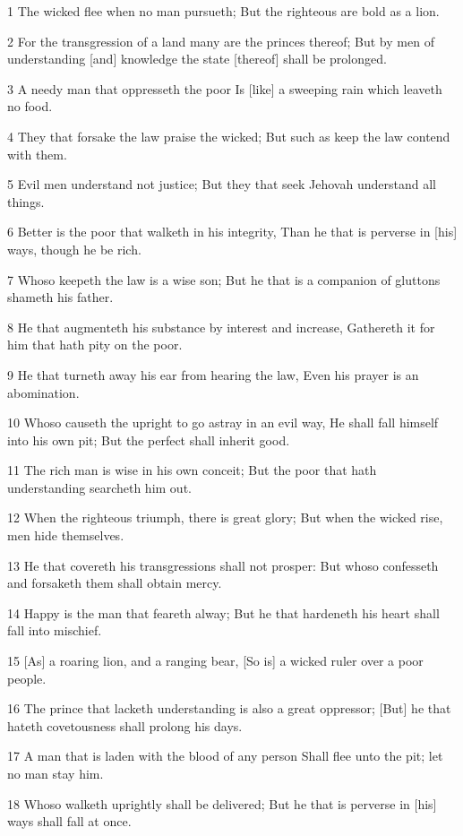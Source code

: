 \par 1 The wicked flee when no man pursueth; But the righteous are bold as a lion.
\par 2 For the transgression of a land many are the princes thereof; But by men of understanding [and] knowledge the state [thereof] shall be prolonged.
\par 3 A needy man that oppresseth the poor Is [like] a sweeping rain which leaveth no food.
\par 4 They that forsake the law praise the wicked; But such as keep the law contend with them.
\par 5 Evil men understand not justice; But they that seek Jehovah understand all things.
\par 6 Better is the poor that walketh in his integrity, Than he that is perverse in [his] ways, though he be rich.
\par 7 Whoso keepeth the law is a wise son; But he that is a companion of gluttons shameth his father.
\par 8 He that augmenteth his substance by interest and increase, Gathereth it for him that hath pity on the poor.
\par 9 He that turneth away his ear from hearing the law, Even his prayer is an abomination.
\par 10 Whoso causeth the upright to go astray in an evil way, He shall fall himself into his own pit; But the perfect shall inherit good.
\par 11 The rich man is wise in his own conceit; But the poor that hath understanding searcheth him out.
\par 12 When the righteous triumph, there is great glory; But when the wicked rise, men hide themselves.
\par 13 He that covereth his transgressions shall not prosper: But whoso confesseth and forsaketh them shall obtain mercy.
\par 14 Happy is the man that feareth alway; But he that hardeneth his heart shall fall into mischief.
\par 15 [As] a roaring lion, and a ranging bear, [So is] a wicked ruler over a poor people.
\par 16 The prince that lacketh understanding is also a great oppressor; [But] he that hateth covetousness shall prolong his days.
\par 17 A man that is laden with the blood of any person Shall flee unto the pit; let no man stay him.
\par 18 Whoso walketh uprightly shall be delivered; But he that is perverse in [his] ways shall fall at once.
